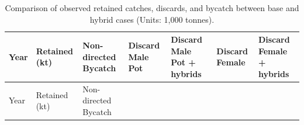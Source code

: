 \documentclass[
]{article}
\begin{document}
\newpage

\newpage

\begin{longtable}[]{@{}
  >{\raggedright\arraybackslash}p{}
  >{\raggedright\arraybackslash}p{}
  >{\raggedright\arraybackslash}p{}
  >{\raggedright\arraybackslash}p{}
  >{\raggedright\arraybackslash}p{}
  >{\raggedright\arraybackslash}p{}
  >{\raggedright\arraybackslash}p{}@{}}
\caption{\label{tab:obscatch} Comparison of observed retained catches, discards, and bycatch between base and hybrid cases (Units: 1,000 tonnes).}\tabularnewline
\toprule\noalign{}
\begin{minipage}[b]{\linewidth}\raggedright
Year
\end{minipage} & \begin{minipage}[b]{\linewidth}\raggedright
Retained
(kt)
\end{minipage} & \begin{minipage}[b]{\linewidth}\raggedright
Non-directed
Bycatch
\end{minipage} & \begin{minipage}[b]{\linewidth}\raggedright
Discard
Male Pot
\end{minipage} & \begin{minipage}[b]{\linewidth}\raggedright
Discard
Male Pot +
hybrids
\end{minipage} & \begin{minipage}[b]{\linewidth}\raggedright
Discard
Female
\end{minipage} & \begin{minipage}[b]{\linewidth}\raggedright
Discard
Female +
hybrids
\end{minipage} \\
\midrule\noalign{}
\endfirsthead
\toprule\noalign{}
\begin{minipage}[b]{\linewidth}\raggedright
Year
\end{minipage} & \begin{minipage}[b]{\linewidth}\raggedright
Retained
(kt)
\end{minipage} & \begin{minipage}[b]{\linewidth}\raggedright
Non-directed
Bycatch
\end{minipage} & \begin{minipage}[b]{\linewidth}\raggedright

\end{minipage}
\end{longtable}
\end{document}
